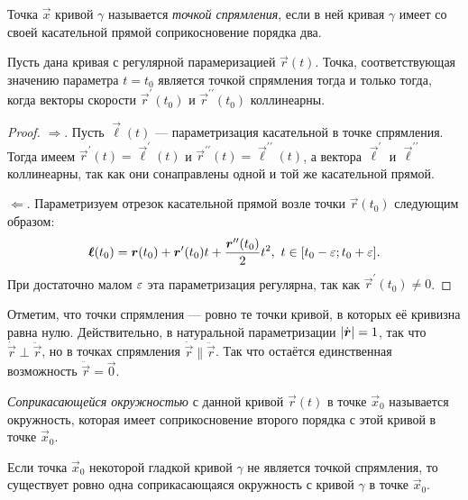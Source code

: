 \begin{definition}
	Точка $\vec{x}$ кривой $\gamma$ называется \textit{точкой спрямления}, если в ней кривая $\gamma$ имеет со своей касательной прямой соприкосновение порядка два.
\end{definition}

\begin{proposition} \label{proposition:Inflection}
	Пусть дана кривая с регулярной парамеризацией $\vec{r}(t)$. Точка, соответствующая значению параметра $t = t_0$ является точкой спрямления тогда и только тогда, когда векторы скорости $\vec{r}^\prime(t_0)$ и $\vec{r}^{\prime\prime}(t_0)$ коллинеарны.
\end{proposition}

\begin{proof}
	$\Rightarrow$. Пусть $\vec{\ell}(t)$ --- параметризация касательной в точке спрямления. Тогда имеем $\vec{r}^\prime(t) = \vec{\ell}^\prime(t)$ и $\vec{r}^{\prime\prime}(t) = \vec{\ell}^{\prime\prime}(t)$, а вектора $\vec{\ell}^\prime$ и $\vec{\ell}^{\prime\prime}$ коллинеарны, так как они сонаправлены одной и той же касательной прямой.

	$\Leftarrow$. Параметризуем отрезок касательной прямой возле точки $\vec{r}(t_0)$ следующим образом:
	\[
		\boldsymbol{\ell}(t_0) = \boldsymbol{r}(t_0) + \boldsymbol{r}^\prime(t_0)t + \frac{\boldsymbol{r}^{\prime\prime}(t_0)}{2}t^2,\ t \in [t_0 - \varepsilon; t_0 + \varepsilon].
	\]
	При достаточно малом $\varepsilon$ эта параметризация регулярна, так как $\vec{r}^{\prime}(t_0) \ne 0$.
\end{proof}

Отметим, что точки спрямления --- ровно те точки кривой, в которых её кривизна равна нулю. Действительно, в натуральной параметризации $\left\lvert\dot{\boldsymbol{r}}\right\rvert = 1$, так что $\dot{\vec{r}} \perp \ddot{\vec{r}}$, но в точках спрямления $\dot{\vec{r}} \parallel \ddot{\vec{r}}$. Так что остаётся единственная возможность $\ddot{\vec{r}} = \vec{0}$.

\begin{definition}
	\textit{Соприкасающейся окружностью} с данной кривой $\vec{r}(t)$ в точке $\vec{x}_0$ называется окружность, которая имеет соприкосновение второго порядка с этой кривой в точке $\vec{x}_0$.
\end{definition}

\begin{theorem} \label{theorem:TouchingCircle}
	Если точка $\vec{x}_0$ некоторой гладкой кривой $\gamma$ не является точкой спрямления, то существует ровно одна соприкасающаяся окружность с кривой $\gamma$ в точке $\vec{x}_0$.
\end{theorem}

